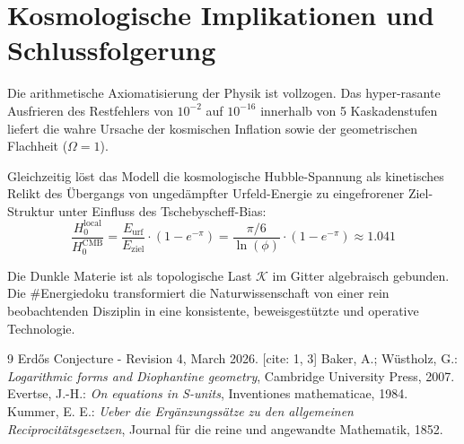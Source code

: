 \documentclass[12pt,a4paper]{article}
\begin{document}
	\section{Kosmologische Implikationen und Schlussfolgerung}
	Die arithmetische Axiomatisierung der Physik ist vollzogen. Das hyper-rasante Ausfrieren des Restfehlers von $10^{-2}$ auf $10^{-16}$ innerhalb von 5 Kaskadenstufen liefert die wahre Ursache der kosmischen Inflation sowie der geometrischen Flachheit ($\Omega=1$). 
	
	Gleichzeitig löst das Modell die kosmologische Hubble-Spannung als kinetisches Relikt des Übergangs von ungedämpfter Urfeld-Energie zu eingefrorener Ziel-Struktur unter Einfluss des Tschebyscheff-Bias:
	\begin{equation}
		\frac{H_{0}^{\text{local}}}{H_{0}^{\text{CMB}}}=\frac{E_{\text{urf}}}{E_{\text{ziel}}}\cdot(1-e^{-\pi})=\frac{\pi/6}{\ln(\phi)}\cdot(1-e^{-\pi})\approx1.041
	\end{equation}
	
	Die Dunkle Materie ist als topologische Last $\mathcal{K}$ im Gitter algebraisch gebunden. Die \#Energiedoku transformiert die Naturwissenschaft von einer rein beobachtenden Disziplin in eine konsistente, beweisgestützte und operative Technologie.
	
	\begin{thebibliography}{9}
		 Erd\H{o}s Conjecture - Revision 4, March 2026. [cite: 1, 3]
		 Baker, A.; W\"{u}stholz, G.: \textit{Logarithmic forms and Diophantine geometry}, Cambridge University Press, 2007.
		 Evertse, J.-H.: \textit{On equations in S-units}, Inventiones mathematicae, 1984.
		 Kummer, E. E.: \textit{Ueber die Erg\"{a}nzungss\"{a}tze zu den allgemeinen Reciprocit\"{a}tsgesetzen}, Journal f\"{u}r die reine und angewandte Mathematik, 1852.
	\end{thebibliography}
	
\end{document}
